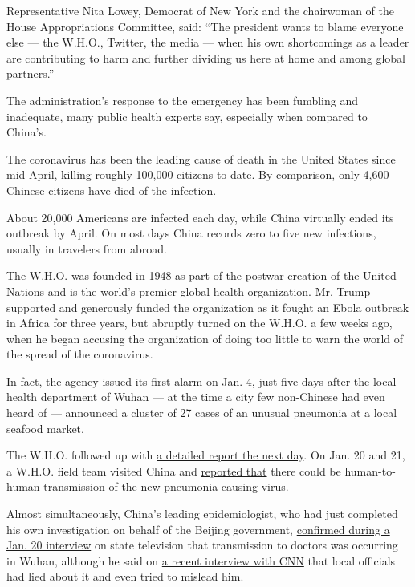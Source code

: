 Representative Nita Lowey, Democrat of New York and the chairwoman of
the House Appropriations Committee, said: ``The president wants to blame
everyone else --- the W.H.O., Twitter, the media --- when his own
shortcomings as a leader are contributing to harm and further dividing
us here at home and among global partners.''

The administration's response to the emergency has been fumbling and
inadequate, many public health experts say, especially when compared to
China's.

The coronavirus has been the leading cause of death in the United States
since mid-April, killing roughly 100,000 citizens to date. By
comparison, only 4,600 Chinese citizens have died of the infection.

About 20,000 Americans are infected each day, while China virtually
ended its outbreak by April. On most days China records zero to five new
infections, usually in travelers from abroad.

The W.H.O. was founded in 1948 as part of the postwar creation of the
United Nations and is the world's premier global health organization.
Mr. Trump supported and generously funded the organization as it fought
an Ebola outbreak in Africa for three years, but abruptly turned on the
W.H.O. a few weeks ago, when he began accusing the organization of doing
too little to warn the world of the spread of the coronavirus.

In fact, the agency issued its first
\href{https://twitter.com/WHO/status/1213523866703814656?s=20}{alarm on
Jan. 4}, just five days after the local health department of Wuhan ---
at the time a city few non-Chinese had even heard of --- announced a
cluster of 27 cases of an unusual pneumonia at a local seafood market.

The W.H.O. followed up with
\href{https://www.who.int/csr/don/05-january-2020-pneumonia-of-unkown-cause-china/en/}{a
detailed report the next day}. On Jan. 20 and 21, a W.H.O. field team
visited China and
\href{https://www.who.int/china/news/detail/22-01-2020-field-visit-wuhan-china-jan-2020}{reported
that} there could be human-to-human transmission of the new
pneumonia-causing virus.

Almost simultaneously, China's leading epidemiologist, who had just
completed his own investigation on behalf of the Beijing government,
\href{https://abcnews.go.com/Health/human-human-transmission-coronavirus-reported-china/story?id=68403105}{confirmed
during a Jan. 20 interview} on state television that transmission to
doctors was occurring in Wuhan, although he said on
\href{https://www.cnn.com/videos/world/2020/05/19/chinas-dr-fauci-zhong-nanshan-coronavirus-intv-culver-pkg-2-intl-hnk-vpx.cnn}{a
recent interview with CNN} that local officials had lied about it and
even tried to mislead him.

